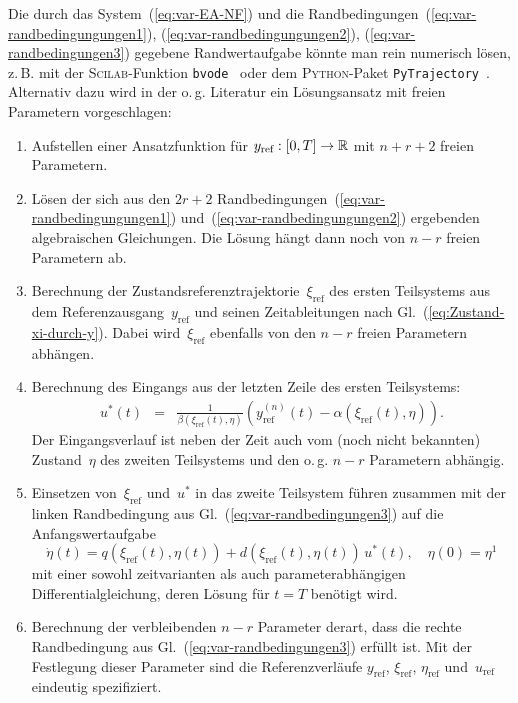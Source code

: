 Die durch das System~(\ref{eq:var-EA-NF}) und die Randbedingungen~(\ref{eq:var-randbedingungungen1}),
(\ref{eq:var-randbedingungungen2}), (\ref{eq:var-randbedingungen3})
gegebene Randwertaufgabe könnte man rein numerisch lösen, z.\,B.
mit der \textsc{Scilab}-Funktion \texttt{bvode}~\cite{campbell2006}
oder dem \textsc{Python}-Paket \texttt{PyTrajectory}~\cite{pytrajectory}.
Alternativ dazu wird in der o.\,g. Literatur ein Lösungsansatz mit
freien Parametern vorgeschlagen:
\begin{enumerate}
\item \label{enu:bvp1}Aufstellen einer Ansatzfunktion für $y_{\text{ref}}:[0,T]\to{\mathbb{R}}$
mit $n+r+2$ freien Parametern.
\item \label{enu:bvp2}Lösen der sich aus den $2r+2$ Randbedingungen~(\ref{eq:var-randbedingungungen1})
und~(\ref{eq:var-randbedingungungen2}) ergebenden algebraischen
Gleichungen. Die Lösung hängt dann noch von $n-r$ freien Parametern
ab.
\item \label{enu:bvp3}Berechnung der Zustandsreferenztrajektorie~$\xi_{\text{ref}}$
des ersten Teilsystems aus dem Referenzausgang~$y_{\text{ref}}$
und seinen Zeitableitungen nach Gl.~(\ref{eq:Zustand-xi-durch-y}).
Dabei wird~$\xi_{\text{ref}}$ ebenfalls von den $n-r$ freien Parametern
abhängen.
\item \label{enu:bvp4}Berechnung des Eingangs aus der letzten Zeile des
ersten Teilsystems: 
\begin{equation}
\begin{array}{lcl}
u^{*}(t) & = & \frac{1}{\beta(\xi_{\text{ref}}(t),\eta)}\left(y_{\text{ref}}^{(n)}(t)-\alpha(\xi_{\text{ref}}(t),\eta)\right).\end{array}\label{eq:uref-feedforward-r}
\end{equation}
Der Eingangsverlauf ist neben der Zeit auch vom (noch nicht bekannten)
Zustand~$\eta$ des zweiten Teilsystems und den o.\,g. $n-r$ Parametern
abhängig.
\item \label{enu:bvp5}Einsetzen von~$\xi_{\text{ref}}$ und~$u^{*}$
in das zweite Teilsystem führen zusammen mit der linken Randbedingung
aus Gl.~(\ref{eq:var-randbedingungen3}) auf die Anfangswertaufgabe
\begin{equation}
\dot{\eta}(t)=q(\xi_{\text{ref}}(t),\eta(t))+d(\xi_{\text{ref}}(t),\eta(t))\,u^{*}(t),\quad\eta(0)=\eta^{1}\label{eq:AWA-TS2-FF}
\end{equation}
mit einer sowohl zeitvarianten als auch parameterabhängigen Differential\-gleichung,
deren Lösung für $t=T$ benötigt wird.
\item \label{enu:bvp6}Berechnung der verbleibenden $n-r$ Parameter derart,
dass die rechte Randbedingung aus Gl.~(\ref{eq:var-randbedingungen3})
erfüllt ist. Mit der Festlegung dieser Parameter sind die Referenzverläufe
$y_{\text{ref}}$, $\xi_{\text{ref}}$, $\eta_{\text{ref}}$ und~$u_{\text{ref}}$
eindeutig spezifiziert.
\end{enumerate}
